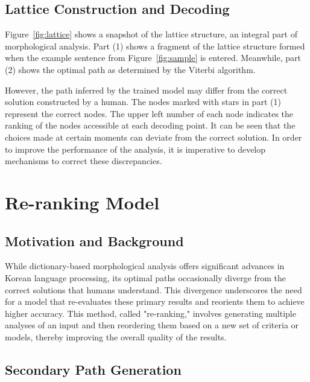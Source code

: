 \documentclass[AMS,STIX2COL]{WileyNJD-v2}
\begin{document}
    \subsection{Lattice Construction and Decoding}\label{subsec3.3}

    Figure~\ref{fig:lattice} shows a snapshot of the lattice structure, an integral part of morphological analysis. Part (1) shows a fragment of the lattice structure formed when the example sentence from Figure~\ref{fig:sample} is entered. Meanwhile, part (2) shows the optimal path as determined by the Viterbi algorithm.

    However, the path inferred by the trained model may differ from the correct solution constructed by a human. The nodes marked with stars in part (1) represent the correct nodes. The upper left number of each node indicates the ranking of the nodes accessible at each decoding point. It can be seen that the choices made at certain moments can deviate from the correct solution. In order to improve the performance of the analysis, it is imperative to develop mechanisms to correct these discrepancies.


    \section{Re-ranking Model}\label{sec:re-ranking-model}

    \subsection{Motivation and Background}\label{subsec4.1}

    While dictionary-based morphological analysis offers significant advances in Korean language processing, its optimal paths occasionally diverge from the correct solutions that humans understand. This divergence underscores the need for a model that re-evaluates these primary results and reorients them to achieve higher accuracy. This method, called "re-ranking," involves generating multiple analyses of an input and then reordering them based on a new set of criteria or models, thereby improving the overall quality of the results.

    \subsection{Secondary Path Generation}\label{subsec4.2}
\end{document}
